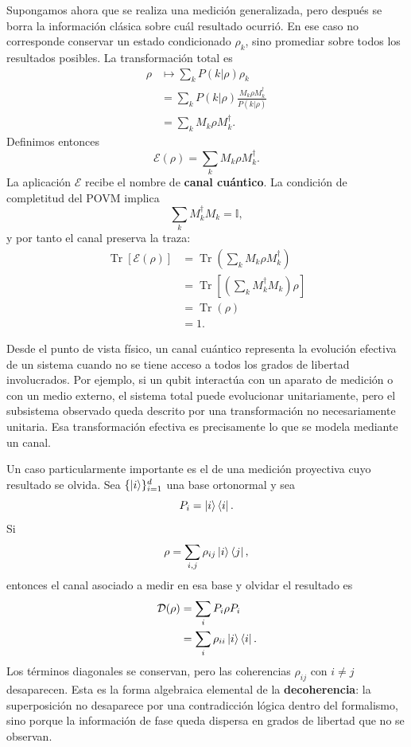 \documentclass[12pt,a4paper]{article}
\theoremstyle{definition}
\theoremstyle{plain}
\theoremstyle{remark}
\newcommand{\I}{\mathbb{I}}
\begin{document}
Supongamos ahora que se realiza una medición generalizada, pero después se borra la información clásica sobre cuál resultado ocurrió. En ese caso no corresponde conservar un estado condicionado $\rho_k$, sino promediar sobre todos los resultados posibles. La transformación total es
\begin{align*}
    \rho
    &\longmapsto
    \sum_k P(k|\rho)\rho_k\\
    &=\sum_k P(k|\rho)
    \frac{M_k\rho M_k^\dagger}{P(k|\rho)}\\
    &=\sum_k M_k\rho M_k^\dagger.
\end{align*}
Definimos entonces
\begin{equation*}
    \mathcal{E}(\rho)=\sum_k M_k\rho M_k^\dagger.
\end{equation*}
La aplicación $\mathcal{E}$ recibe el nombre de \textbf{canal cuántico}. La condición de completitud del POVM implica
\begin{equation*}
    \sum_k M_k^\dagger M_k=\I,
\end{equation*}
y por tanto el canal preserva la traza:
\begin{align*}
    \operatorname{Tr}[\mathcal{E}(\rho)]
    &=\operatorname{Tr}\left(\sum_kM_k\rho M_k^\dagger\right)\\
    &=\operatorname{Tr}\left[\left(\sum_kM_k^\dagger M_k\right)\rho\right]\\
    &=\operatorname{Tr}(\rho)\\
    &=1.
\end{align*}

Desde el punto de vista físico, un canal cuántico representa la evolución efectiva de un sistema cuando no se tiene acceso a todos los grados de libertad involucrados. Por ejemplo, si un qubit interactúa con un aparato de medición o con un medio externo, el sistema total puede evolucionar unitariamente, pero el subsistema observado queda descrito por una transformación no necesariamente unitaria. Esa transformación efectiva es precisamente lo que se modela mediante un canal.

Un caso particularmente importante es el de una medición proyectiva cuyo resultado se olvida. Sea $\{\ket{i}\}_{i=1}^{d}$ una base ortonormal y sea
\begin{equation*}
    P_i=\ket{i}\bra{i}.
\end{equation*}
Si
\begin{equation*}
    \rho=\sum_{i,j}\rho_{ij}\ket{i}\bra{j},
\end{equation*}
entonces el canal asociado a medir en esa base y olvidar el resultado es
\begin{align*}
    \mathcal{D}(\rho)
    &=\sum_i P_i\rho P_i\\
    &=\sum_i\rho_{ii}\ket{i}\bra{i}.
\end{align*}
Los términos diagonales se conservan, pero las coherencias $\rho_{ij}$ con $i\neq j$ desaparecen. Esta es la forma algebraica elemental de la \textbf{decoherencia}: la superposición no desaparece por una contradicción lógica dentro del formalismo, sino porque la información de fase queda dispersa en grados de libertad que no se observan.
\end{document}
